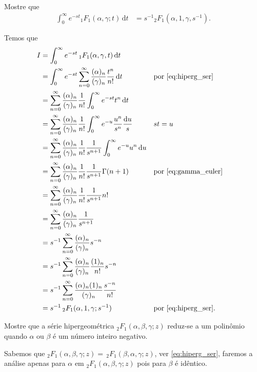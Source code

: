 \documentclass[a4paper,12pt, leqno, answers]{exam}
\begin{document}
\begin{questions}
    \question[E de 2006] Mostre que
    \begin{align*}
        \int_0^\infty e^{-s t} {}_1F_1(\alpha, \gamma; t) \,\mathrm{d}t &= s^{-1} {}_2F_1(\alpha, 1, \gamma, s^{-1}).
    \end{align*}
    \begin{solution}
        Temos que
        \begin{align*}
            I &= \int_0^\infty e^{-st} \,_1F_1(\alpha, \gamma, t) \,\mathrm{d}t \\ 
            &= \int_0^\infty e^{-st} \sum_{n = 0}^\infty \frac{(\alpha)_n}{(\gamma)_n} \frac{t^n}{n!} \,\mathrm{d}t && \text{por \eqref{eq:hiperg_ser}} \\
            &= \sum_{n = 0}^\infty \frac{(\alpha)_n}{(\gamma)_n} \frac{1}{n!} \int_0^\infty e^{-st} t^n \,\mathrm{d}t \\
            &= \sum_{n = 0}^\infty \frac{(\alpha)_n}{(\gamma)_n} \frac{1}{n!} \int_0^\infty e^{-u} \frac{u^n}{s^n} \frac{\mathrm{d}u}{s} && st = u \\
            &= \sum_{n = 0}^\infty \frac{(\alpha)_n}{(\gamma)_n} \frac{1}{n!} \frac{1}{s^{n + 1}} \int_0^\infty e^{-u} u^n \,\mathrm{d}u \\
            &= \sum_{n = 0}^\infty \frac{(\alpha)_n}{(\gamma)_n} \frac{1}{n!} \frac{1}{s^{n + 1}} \Gamma(n + 1) && \text{por \eqref{eq:gamma_euler}} \\
            &= \sum_{n = 0}^\infty \frac{(\alpha)_n}{(\gamma)_n} \frac{1}{n!} \frac{1}{s^{n + 1}} n! \\
            &= \sum_{n = 0}^\infty \frac{(\alpha)_n}{(\gamma)_n} \frac{1}{s^{n + 1}} \\
            &= s^{-1} \sum_{n = 0}^\infty \frac{(\alpha)_n}{(\gamma)_n} s^{-n} \\
            &= s^{-1} \sum_{n = 0}^\infty \frac{(\alpha)_n}{(\gamma)_n} \frac{(1)_n}{n!} s^{-n} \\
            &= s^{-1} \sum_{n = 0}^\infty \frac{(\alpha)_n (1)_n}{(\gamma)_n} \frac{s^{-n}}{n!} \\
            &= s^{-1} \,_2F_1(\alpha, 1, \gamma; s^{-1}) && \text{por \eqref{eq:hiperg_ser}}.
        \end{align*}
    \end{solution}

    \question Mostre que a s\'{e}rie hipergeom\'{e}trica ${}_2F_1(\alpha, \beta, \gamma; z)$ reduz-se a um polin\^{o}mio quando $\alpha$ ou $\beta$ \'{e} um número inteiro negativo.
    \begin{solution}
        Sabemos que $_2F_1(\alpha, \beta, \gamma; z) = \,_2F_1(\beta, \alpha, \gamma; z)$, ver \eqref{eq:hiperg_ser}, faremos a an\'{a}lise apenas para $\alpha$ em $_2F_1(\alpha, \beta, \gamma; z)$ pois para $\beta$ \'{e} id\^{e}ntico.


\end{solution}
\end{questions}
\end{document}
